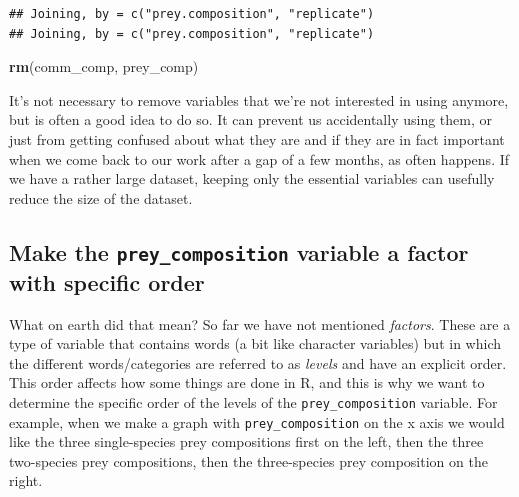 \documentclass[]{book}
\makeatletter
\newenvironment{Shaded}{\begin{snugshade}}{\end{snugshade}}
\newcommand{\KeywordTok}[1]{\textcolor[rgb]{0.13,0.29,0.53}{\textbf{#1}}}
\newcommand{\NormalTok}[1]{#1}
\newcommand{\OperatorTok}[1]{\textcolor[rgb]{0.81,0.36,0.00}{\textbf{#1}}}
\newcommand{\StringTok}[1]{\textcolor[rgb]{0.31,0.60,0.02}{#1}}
\newenvironment{kframe}{%
\medskip{}
\setlength{\fboxsep}{.8em}
 \def\at@end@of@kframe{}%
 \ifinner\ifhmode%
  \def\at@end@of@kframe{\end{minipage}}%
  \begin{minipage}{\columnwidth}%
 \fi\fi%
 \def\FrameCommand##1{\hskip\@totalleftmargin \hskip-\fboxsep
 \colorbox{shadecolor}{##1}\hskip-\fboxsep
     \hskip-\linewidth \hskip-\@totalleftmargin \hskip\columnwidth}%
 \MakeFramed {\advance\hsize-\width
   \@totalleftmargin\z@ \linewidth\hsize
   \@setminipage}}%
 {\par\unskip\endMakeFramed%
 \at@end@of@kframe}
\newenvironment{rmdblock}[1]
  {
  \begin{itemize}
  \renewcommand{\labelitemi}{
    \raisebox{-.7\height}[0pt][0pt]{
      {\setkeys{Gin}{width=3em,keepaspectratio}\texttt{[image: images/\#1]}}
    }
  }
  \setlength{\fboxsep}{1em}
  \begin{kframe}
  \item
  }
  {
  \end{kframe}
  \end{itemize}
  }
\newenvironment{safety}
  {\begin{rmdblock}{safety}}
  {\end{rmdblock}}
\makeatother
\begin{document}
\begin{Shaded}
\end{Shaded}

\begin{verbatim}
## Joining, by = c("prey.composition", "replicate")
## Joining, by = c("prey.composition", "replicate")
\end{verbatim}

\begin{Shaded}
\begin{Highlighting}[]
\KeywordTok{rm}\NormalTok{(comm_comp, prey_comp)}
\end{Highlighting}
\end{Shaded}

\begin{safety}
It's not necessary to remove variables that we're not interested in
using anymore, but is often a good idea to do so. It can prevent us
accidentally using them, or just from getting confused about what they
are and if they are in fact important when we come back to our work
after a gap of a few months, as often happens. If we have a rather large
dataset, keeping only the essential variables can usefully reduce the
size of the dataset.
\end{safety}

\hypertarget{make-the-prey_composition-variable-a-factor-with-specific-order}{%
\subsection{\texorpdfstring{Make the \texttt{prey\_composition} variable a factor with specific order}{Make the prey\_composition variable a factor with specific order}}\label{make-the-prey_composition-variable-a-factor-with-specific-order}}

What on earth did that mean? So far we have not mentioned \emph{factors}. These are a type of variable that contains words (a bit like character variables) but in which the different words/categories are referred to as \emph{levels} and have an explicit order. This order affects how some things are done in R, and this is why we want to determine the specific order of the levels of the \texttt{prey\_composition} variable. For example, when we make a graph with \texttt{prey\_composition} on the x axis we would like the three single-species prey compositions first on the left, then the three two-species prey compositions, then the three-species prey composition on the right.
\end{document}

